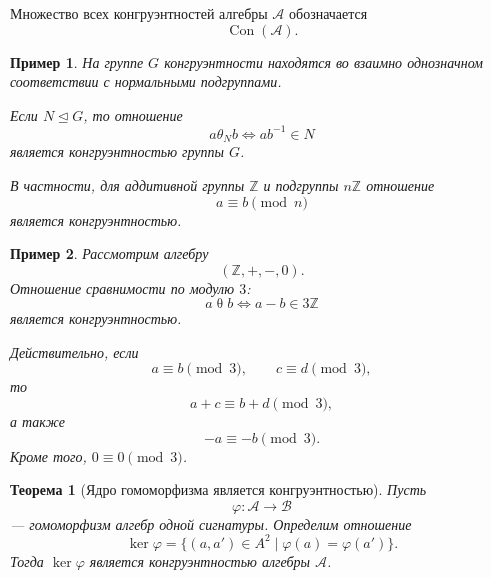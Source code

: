\documentclass[12pt,a4paper]{article}
\newtheorem{theorem}{Теорема}
\newtheorem{example}{Пример}
\begin{document}
Множество всех конгруэнтностей алгебры $\mathcal A$ обозначается
\[
\operatorname{Con}(\mathcal A).
\]

\begin{example}
На группе $G$ конгруэнтности находятся во взаимно однозначном соответствии с нормальными подгруппами.

Если $N\trianglelefteq G$, то отношение
\[
a\mathrel{\theta_N}b
\Longleftrightarrow
ab^{-1}\in N
\]
является конгруэнтностью группы $G$.

В частности, для аддитивной группы $\mathbb Z$ и подгруппы $n\mathbb Z$ отношение
\[
a\equiv b\pmod n
\]
является конгруэнтностью.
\end{example}

\begin{example}
Рассмотрим алгебру
\[
(\mathbb Z,+,-,0).
\]
Отношение сравнимости по модулю $3$:
\[
a\mathrel{\theta}b
\Longleftrightarrow
a-b\in 3\mathbb Z
\]
является конгруэнтностью.

Действительно, если
\[
a\equiv b\pmod 3,
\qquad
c\equiv d\pmod 3,
\]
то
\[
a+c\equiv b+d\pmod 3,
\]
а также
\[
-a\equiv -b\pmod 3.
\]
Кроме того, $0\equiv 0\pmod 3$.
\end{example}

\begin{theorem}[Ядро гомоморфизма является конгруэнтностью]
Пусть
\[
\varphi\colon \mathcal A\to\mathcal B
\]
--- гомоморфизм алгебр одной сигнатуры. Определим отношение
\[
\ker\varphi=\{(a,a')\in A^2\mid \varphi(a)=\varphi(a')\}.
\]
Тогда $\ker\varphi$ является конгруэнтностью алгебры $\mathcal A$.
\end{theorem}
\end{document}
